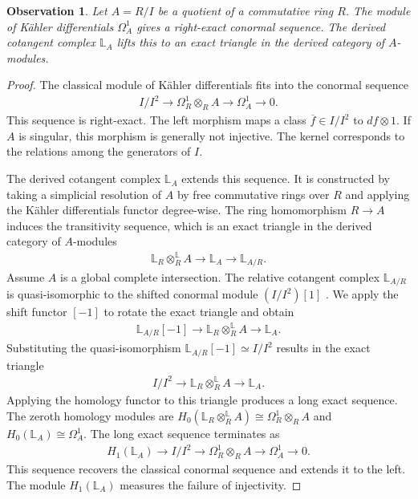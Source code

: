 \documentclass[reqno]{amsart}
\newtheorem{observation}[theorem]{Observation}
\theoremstyle{definition}
\theoremstyle{remark}
\begin{document}
\begin{observation}
  \label{prop:cotangent_necessity}
  Let $A = R/I$ be a quotient of a commutative ring $R$. The module of K\"{a}hler differentials $\Omega^1_A$ gives a right-exact conormal sequence. The derived cotangent complex $\mathbb{L}_A$ lifts this to an exact triangle in the derived category of $A$-modules.
\end{observation}
\begin{proof}
  The classical module of K\"{a}hler differentials fits into the conormal sequence
  \begin{align*}
    I/I^2 \to \Omega^1_R \otimes_R A \to \Omega^1_A \to 0.
  \end{align*}
  This sequence is right-exact. The left morphism maps a class $\overline{f} \in I/I^2$ to $df \otimes 1$. If $A$ is singular, this morphism is generally not injective. The kernel corresponds to the relations among the generators of $I$.

  The derived cotangent complex $\mathbb{L}_A$ extends this sequence. It is constructed by taking a simplicial resolution of $A$ by free commutative rings over $R$ and applying the K\"{a}hler differentials functor degree-wise. The ring homomorphism $R \to A$ induces the transitivity sequence, which is an exact triangle in the derived category of $A$-modules
  \begin{align*}
    \mathbb{L}_R \otimes_R^{\mathbb{L}} A \to \mathbb{L}_A \to \mathbb{L}_{A/R}.
  \end{align*}
  Assume $A$ is a global complete intersection. The relative cotangent complex $\mathbb{L}_{A/R}$ is quasi-isomorphic to the shifted conormal module $(I/I^2)[1]$ \cite[Section 1.1]{Calaque}. We apply the shift functor $[-1]$ to rotate the exact triangle and obtain
  \begin{align*}
    \mathbb{L}_{A/R}[-1] \to \mathbb{L}_R \otimes_R^{\mathbb{L}} A \to \mathbb{L}_A.
  \end{align*}
  Substituting the quasi-isomorphism $\mathbb{L}_{A/R}[-1] \simeq I/I^2$ results in the exact triangle
  \begin{align*}
    I/I^2 \to \mathbb{L}_R \otimes_R^{\mathbb{L}} A \to \mathbb{L}_A.
  \end{align*}
  Applying the homology functor to this triangle produces a long exact sequence. The zeroth homology modules are $H_0(\mathbb{L}_R \otimes_R^{\mathbb{L}} A) \cong \Omega^1_R \otimes_R A$ and $H_0(\mathbb{L}_A) \cong \Omega^1_A$. The long exact sequence terminates as
  \begin{align*}
    H_1(\mathbb{L}_A) \to I/I^2 \to \Omega^1_R \otimes_R A \to \Omega^1_A \to 0.
  \end{align*}
  This sequence recovers the classical conormal sequence and extends it to the left. The module $H_1(\mathbb{L}_A)$ measures the failure of injectivity. 
  
\end{proof}
\end{document}
